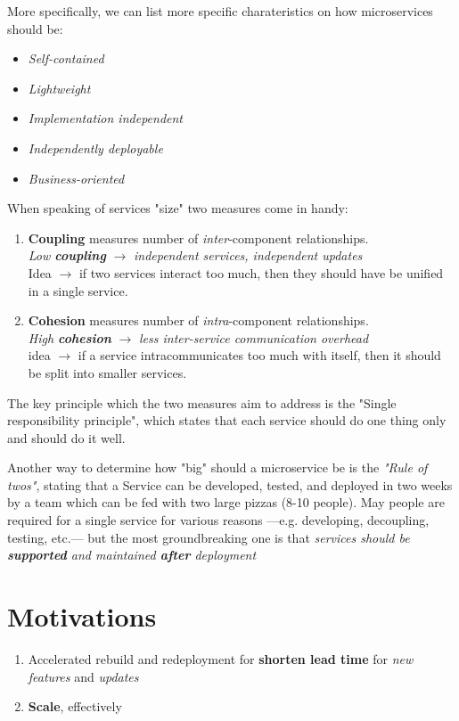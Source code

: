 More specifically, we can list more specific charateristics on how microservices should be:
\begin{itemize}
   \item \textit{Self-contained}
   \item \textit{Lightweight}
   \item \textit{Implementation independent}
   \item \textit{Independently deployable}
   \item \textit{Business-oriented}
\end{itemize}

When speaking of services "size" two measures come in handy:
\begin{enumerate}
   \item 
   \textbf{Coupling} measures number of \textit{inter}-component relationships.\\
   \textit{Low \textbf{coupling}} $\longrightarrow$ \textit{independent services, independent updates}\\
   Idea $\longrightarrow$ if two services interact too much, then they should have be unified in a single service.
   \item \textbf{Cohesion} measures number of \textit{intra}-component relationships.\\
   \textit{High \textbf{cohesion}} $\longrightarrow$ \textit{less inter-service communication overhead}\\
   idea $\longrightarrow$ if a service intracommunicates too much with itself, then it should be split into smaller services.
\end{enumerate}
The key principle which the two measures aim to address is the "Single responsibility principle",
which states that each service should do one thing only and should do it well.

Another way to determine how "big" should a microservice be is the \textit{"Rule of twos"}, stating that a Service can be developed, tested, and deployed in two weeks by a team which can be fed with two large pizzas (8-10 people).
May people are required for a single service for various reasons {---}e.g. developing, decoupling, testing, etc.{---} but
the most groundbreaking one is that \emph{services should be \textbf{supported} and maintained \textbf{after} deployment}

\section{Motivations}
\begin{enumerate}
   \item Accelerated rebuild and redeployment for \textbf{shorten lead time} for \textit{new features} and \textit{updates}
   \item \textbf{Scale}, effectively
\end{enumerate}

